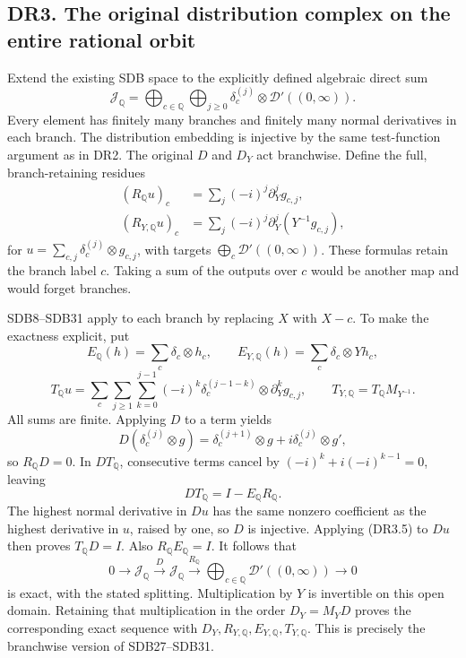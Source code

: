 \subsection{DR3. The original distribution complex on the entire
rational
orbit}\label{dr3.-the-original-distribution-complex-on-the-entire-rational-orbit}

Extend the existing SDB space to the explicitly defined algebraic direct
sum \[
 \mathcal J_{\mathbb Q}
   =\bigoplus_{c\in\mathbb Q}\bigoplus_{j\ge0}
       \delta_c^{(j)}\otimes\mathcal D'((0,\infty)).
\tag{DR3.1}
\] Every element has finitely many branches and finitely many normal
derivatives in each branch. The distribution embedding is injective by
the same test-function argument as in DR2. The original \(D\) and
\(D_Y\) act branchwise. Define the full, branch-retaining residues \[
 \begin{aligned}
 (R_{\mathbb Q}u)_c
   &=\sum_j(-i)^j\partial_Y^jg_{c,j},\\
 (R_{Y,\mathbb Q}u)_c
   &=\sum_j(-i)^j\partial_Y^j(Y^{-1}g_{c,j}),
 \end{aligned}
\tag{DR3.2}
\] for \(u=\sum_{c,j}\delta_c^{(j)}\otimes g_{c,j}\), with targets
\(\bigoplus_c\mathcal D'((0,\infty))\). These formulas retain the branch
label \(c\). Taking a sum of the outputs over \(c\) would be another map
and would forget branches.

SDB8--SDB31 apply to each branch by replacing \(X\) with \(X-c\). To
make the exactness explicit, put \[
 E_{\mathbb Q}(h)=\sum_c\delta_c\otimes h_c,\qquad
 E_{Y,\mathbb Q}(h)=\sum_c\delta_c\otimes Yh_c,
\] \[
 T_{\mathbb Q}u
  =\sum_c\sum_{j\ge1}\sum_{k=0}^{j-1}
      (-i)^k\delta_c^{(j-1-k)}\otimes
            \partial_Y^kg_{c,j},\qquad
 T_{Y,\mathbb Q}=T_{\mathbb Q}M_{Y^{-1}}.
\tag{DR3.3}
\] All sums are finite. Applying \(D\) to a term yields \[
 D(\delta_c^{(j)}\otimes g)
      =\delta_c^{(j+1)}\otimes g
        +i\delta_c^{(j)}\otimes g',
\tag{DR3.4}
\] so \(R_{\mathbb Q}D=0\). In \(DT_{\mathbb Q}\), consecutive terms
cancel by \((-i)^k+i(-i)^{k-1}=0\), leaving \[
 DT_{\mathbb Q}=I-E_{\mathbb Q}R_{\mathbb Q}.
\tag{DR3.5}
\] The highest normal derivative in \(Du\) has the same nonzero
coefficient as the highest derivative in \(u\), raised by one, so \(D\)
is injective. Applying (DR3.5) to \(Du\) then proves
\(T_{\mathbb Q}D=I\). Also \(R_{\mathbb Q}E_{\mathbb Q}=I\). It follows
that \[
 0\longrightarrow\mathcal J_{\mathbb Q}
 \xrightarrow{D}\mathcal J_{\mathbb Q}
 \xrightarrow{R_{\mathbb Q}}
       \bigoplus_{c\in\mathbb Q}\mathcal D'((0,\infty))
 \longrightarrow0
\tag{DR3.6}
\] is exact, with the stated splitting. Multiplication by \(Y\) is
invertible on this open domain. Retaining that multiplication in the
order \(D_Y=M_YD\) proves the corresponding exact sequence with
\(D_Y,R_{Y,\mathbb Q},E_{Y,\mathbb Q},T_{Y,\mathbb Q}\). This is
precisely the branchwise version of SDB27--SDB31.

